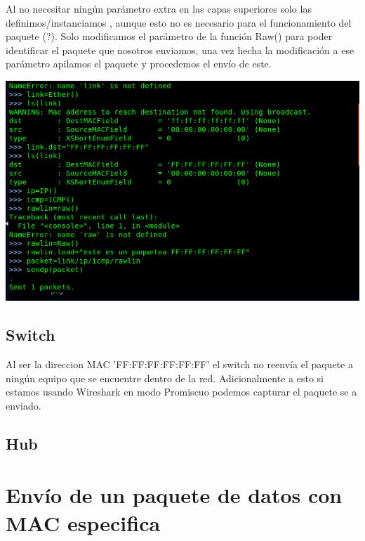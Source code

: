 ﻿\documentclass[spanish]{udpreport}
\begin{document}
Al no necesitar ningún parámetro extra en las capas superiores solo las definimos/instanciamos , aunque esto no es necesario para el funcionamiento del paquete (?). Solo modificamos el parámetro de la función Raw() para poder identificar el paquete que nosotros enviamos, una vez hecha la modificación a ese parámetro apilamos el paquete y procedemos el envío de este.

\begin{center}
	\includegraphics[scale=.37]{imagenes/Switch/Test_1b.png}
\end{center}

\subsection{Switch}

Al ser la direccion MAC 'FF:FF:FF:FF:FF:FF' el switch no reenvía el paquete a ningún equipo que se encuentre dentro de la red. Adicionalmente a esto si estamos usando Wireshark en modo Promiscuo podemos capturar el paquete se a enviado.





\subsection{Hub}

\section{Envío de un paquete de datos con MAC especifica}
\end{document}
